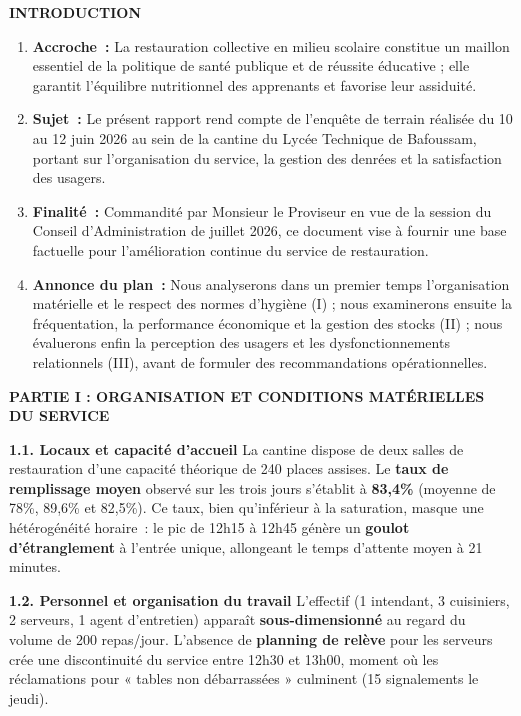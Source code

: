 \documentclass[11pt]{article}
\begin{document}
\begin{exoresolu}
\noindent \textbf{INTRODUCTION}
\begin{enumerate}
    \item \textbf{Accroche~:} La restauration collective en milieu scolaire constitue un maillon essentiel de la politique de santé publique et de réussite éducative ; elle garantit l'équilibre nutritionnel des apprenants et favorise leur assiduité.
    \item \textbf{Sujet~:} Le présent rapport rend compte de l'enquête de terrain réalisée du 10 au 12 juin 2026 au sein de la cantine du Lycée Technique de Bafoussam, portant sur l'organisation du service, la gestion des denrées et la satisfaction des usagers.
    \item \textbf{Finalité~:} Commandité par Monsieur le Proviseur en vue de la session du Conseil d'Administration de juillet 2026, ce document vise à fournir une base factuelle pour l'amélioration continue du service de restauration.
    \item \textbf{Annonce du plan~:} Nous analyserons dans un premier temps l'organisation matérielle et le respect des normes d'hygiène (I) ; nous examinerons ensuite la fréquentation, la performance économique et la gestion des stocks (II) ; nous évaluerons enfin la perception des usagers et les dysfonctionnements relationnels (III), avant de formuler des recommandations opérationnelles.
\end{enumerate}

\noindent \textbf{PARTIE I : ORGANISATION ET CONDITIONS MATÉRIELLES DU SERVICE}

\noindent \textbf{1.1. Locaux et capacité d'accueil}
La cantine dispose de deux salles de restauration d'une capacité théorique de 240 places assises. Le \textbf{taux de remplissage moyen} observé sur les trois jours s'établit à \textbf{83,4\%} (moyenne de 78\%, 89,6\% et 82,5\%). Ce taux, bien qu'inférieur à la saturation, masque une hétérogénéité horaire~: le pic de 12h15 à 12h45 génère un \textbf{goulot d'étranglement} à l'entrée unique, allongeant le temps d'attente moyen à 21 minutes.

\noindent \textbf{1.2. Personnel et organisation du travail}
L'effectif (1 intendant, 3 cuisiniers, 2 serveurs, 1 agent d'entretien) apparaît \textbf{sous-dimensionné} au regard du volume de 200 repas/jour. L'absence de \textbf{planning de relève} pour les serveurs crée une discontinuité du service entre 12h30 et 13h00, moment où les réclamations pour « tables non débarrassées » culminent (15 signalements le jeudi).


\end{exoresolu}
\end{document}
